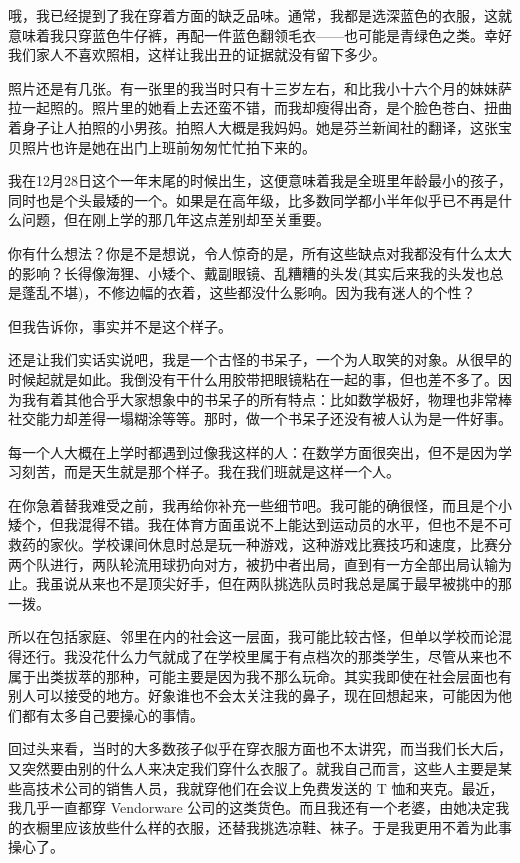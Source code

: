 \documentclass[12pt,UTF8]{ctexbook}
\begin{document}
哦，我已经提到了我在穿着方面的缺乏品味。通常，我都是选深蓝色的衣服，这就意味着我只穿蓝色牛仔裤，再配一件蓝色翻领毛衣——也可能是青绿色之类。幸好我们家人不喜欢照相，这样让我出丑的证据就没有留下多少。

照片还是有几张。有一张里的我当时只有十三岁左右，和比我小十六个月的妹妹萨拉一起照的。照片里的她看上去还蛮不错，而我却瘦得出奇，是个脸色苍白、扭曲着身子让人拍照的小男孩。拍照人大概是我妈妈。她是芬兰新闻社的翻译，这张宝贝照片也许是她在出门上班前匆匆忙忙拍下来的。

我在12月28日这个一年末尾的时候出生，这便意味着我是全班里年龄最小的孩子，同时也是个头最矮的一个。如果是在高年级，比多数同学都小半年似乎已不再是什么问题，但在刚上学的那几年这点差别却至关重要。

你有什么想法？你是不是想说，令人惊奇的是，所有这些缺点对我都没有什么太大的影响？长得像海狸、小矮个、戴副眼镜、乱糟糟的头发(其实后来我的头发也总是蓬乱不堪)，不修边幅的衣着，这些都没什么影响。因为我有迷人的个性？

但我告诉你，事实并不是这个样子。

还是让我们实话实说吧，我是一个古怪的书呆子，一个为人取笑的对象。从很早的时候起就是如此。我倒没有干什么用胶带把眼镜粘在一起的事，但也差不多了。因为我有着其他合乎大家想象中的书呆子的所有特点：比如数学极好，物理也非常棒社交能力却差得一塌糊涂等等。那时，做一个书呆子还没有被人认为是一件好事。

每一个人大概在上学时都遇到过像我这样的人：在数学方面很突出，但不是因为学习刻苦，而是天生就是那个样子。我在我们班就是这样一个人。

在你急着替我难受之前，我再给你补充一些细节吧。我可能的确很怪，而且是个小矮个，但我混得不错。我在体育方面虽说不上能达到运动员的水平，但也不是不可救药的家伙。学校课间休息时总是玩一种游戏，这种游戏比赛技巧和速度，比赛分两个队进行，两队轮流用球扔向对方，被扔中者出局，直到有一方全部出局认输为止。我虽说从来也不是顶尖好手，但在两队挑选队员时我总是属于最早被挑中的那一拨。

所以在包括家庭、邻里在内的社会这一层面，我可能比较古怪，但单以学校而论混得还行。我没花什么力气就成了在学校里属于有点档次的那类学生，尽管从来也不属于出类拔萃的那种，可能主要是因为我不那么玩命。其实我即使在社会层面也有别人可以接受的地方。好象谁也不会太关注我的鼻子，现在回想起来，可能因为他们都有太多自己要操心的事情。

回过头来看，当时的大多数孩子似乎在穿衣服方面也不太讲究，而当我们长大后，又突然要由别的什么人来决定我们穿什么衣服了。就我自己而言，这些人主要是某些高技术公司的销售人员，我就穿他们在会议上免费发送的 T 恤和夹克。最近，我几乎一直都穿 Vendorware 公司的这类货色。而且我还有一个老婆，由她决定我的衣橱里应该放些什么样的衣服，还替我挑选凉鞋、袜子。于是我更用不着为此事操心了。
\end{document}

